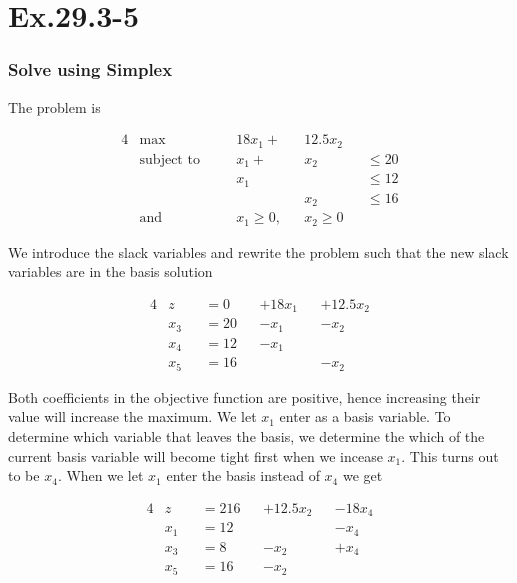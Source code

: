 \section*{Ex.29.3-5}
\subsubsection*{Solve using Simplex}

The problem is

\begin{alignat*}{4}
&\max              \quad && 18x_1 +    &&12.5x_2       &&         \\
&\text{subject to} \quad && x_1   +    &&    x_2       && \leq 20 \\
&                        && x_1        &&              && \leq 12 \\
&                        &&            &&    x_2       && \leq 16 \\
&\text{and} \quad        && x_1 \geq 0,&&    x_2 \geq 0&&
\end{alignat*}

We introduce the slack variables and rewrite the problem such that the new slack variables are in the basis solution

\begin{alignat*}{4}
&z     &&=  0  && +18x_1  &&+12.5x_2    \\
&x_3   &&= 20  && -x_1    &&    -x_2       \\
&x_4   &&= 12  && -x_1    &&               \\
&x_5   &&= 16  &&         &&    -x_2 
\end{alignat*}

Both coefficients in the objective function are positive, hence increasing their value will increase the maximum. We let $x_1$ enter as a basis variable. To determine which variable that leaves the basis, we determine the which of the current  basis variable will become tight first when we incease $x_1$. This turns out to be $x_4$. When we let $x_1$ enter the basis instead of $x_4$ we get

\begin{alignat*}{4}
&z     &&=  216  && + 12.5 x_2 &&   -18x_4    \\
&x_1   &&= 12    &&            &&     -x_4       \\
&x_3   &&= 8     &&       -x_2 &&     +x_4       \\
&x_5   &&= 16    &&       -x_2 &&    
\end{alignat*}

